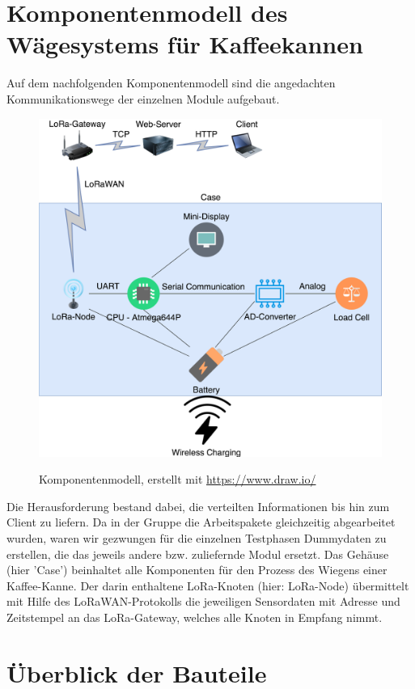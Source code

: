 \chapter{Komponentenmodell des Wägesystems für Kaffeekannen}
Auf dem nachfolgenden Komponentenmodell sind die angedachten Kommunikationswege der einzelnen Module aufgebaut. 
\begin{figure}[H]
    \center
    \includegraphics[width=15cm]{Bilder/komponentenmodell.png}\\
    \caption{Komponentenmodell, erstellt mit \url{https://www.draw.io/}}
    \label{fig:Komponentenmodell}
\end{figure}
\noindent
Die Herausforderung bestand dabei, die verteilten Informationen bis hin zum Client zu liefern. Da in der Gruppe die Arbeitspakete gleichzeitig abgearbeitet wurden, waren wir gezwungen für die einzelnen Testphasen Dummydaten zu erstellen, die das jeweils andere bzw. zuliefernde Modul ersetzt.
Das Gehäuse (hier 'Case') beinhaltet alle Komponenten für den Prozess des Wiegens einer Kaffee-Kanne. Der darin enthaltene LoRa-Knoten (hier: LoRa-Node) übermittelt mit Hilfe des LoRaWAN-Protokolls die jeweiligen Sensordaten mit Adresse und Zeitstempel an das LoRa-Gateway, welches alle Knoten in Empfang nimmt.

\chapter{Überblick der Bauteile}
